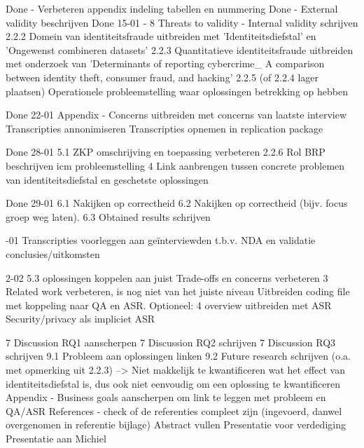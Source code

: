 Done - Verbeteren appendix indeling tabellen en nummering
Done - External validity beschrijven
Done 15-01 - 
8 Threats to validity - Internal validity schrijven
2.2.2 Domein van identiteitsfraude uitbreiden met 'Identiteitsdiefstal' en 'Ongewenst combineren datasets'
2.2.3 Quantitatieve identiteitsfraude uitbreiden met onderzoek van 'Determinants of reporting cybercrime_ A
comparison between identity theft, consumer fraud, and hacking'
2.2.5 (of 2.2.4 lager plaatsen) Operationele probleemstelling waar oplossingen betrekking op hebben

Done 22-01
Appendix - Concerns uitbreiden met concerns van laatste interview
Transcripties annonimiseren
Transcripties opnemen in replication package

Done 28-01
5.1 ZKP omschrijving en toepassing verbeteren
2.2.6 Rol BRP beschrijven icm probleemstelling
4 Link aanbrengen tussen concrete problemen van identiteitsdiefstal en geschetste oplossingen

Done 29-01
6.1 Nakijken op correctheid
6.2 Nakijken op correctheid (bijv. focus groep weg laten).
6.3 Obtained results schrijven

-01
Transcripties voorleggen aan geïnterviewden t.b.v. NDA en validatie conclusies/uitkomsten


2-02
5.3 oplossingen koppelen aan juist Trade-offs en concerns verbeteren
3 Related work verbeteren, is nog niet van het juiste niveau
Uitbreiden coding file met koppeling naar QA en ASR.
Optioneel: 4 overview uitbreiden met ASR Security/privacy als impliciet ASR

7 Discussion RQ1 aanscherpen
7 Discussion RQ2 schrijven
7 Discussion RQ3 schrijven
9.1 Probleem aan oplossingen linken
9.2 Future research schrijven (o.a. met opmerking uit 2.2.3)
--> Niet makkelijk te kwantificeren wat het effect van identiteitsdiefstal is, dus ook niet eenvoudig om een oplossing te kwantificeren
Appendix - Business goals aanscherpen om link te leggen met probleem en QA/ASR
References - check of de referenties compleet zijn (ingevoerd, danwel overgenomen in referentie bijlage)
Abstract vullen
Presentatie voor verdediging
Presentatie aan Michiel